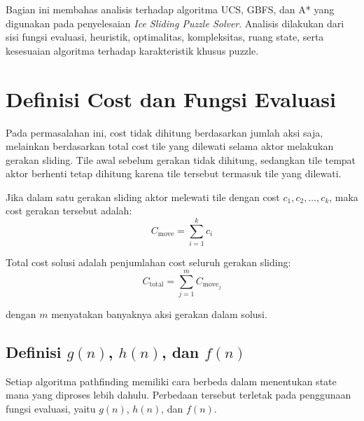 Bagian ini membahas analisis terhadap algoritma UCS, GBFS, dan A* yang digunakan pada penyelesaian \textit{Ice Sliding Puzzle Solver}. 
Analisis dilakukan dari sisi fungsi evaluasi, heuristik, optimalitas, kompleksitas, ruang state, serta kesesuaian algoritma terhadap karakteristik khusus puzzle.

\section{Definisi Cost dan Fungsi Evaluasi}

Pada permasalahan ini, cost tidak dihitung berdasarkan jumlah aksi saja, melainkan berdasarkan total cost tile yang dilewati selama aktor melakukan gerakan sliding. 
Tile awal sebelum gerakan tidak dihitung, sedangkan tile tempat aktor berhenti tetap dihitung karena tile tersebut termasuk tile yang dilewati.

\begin{tcolorbox}[
	colback=blue!5,
	colframe=blue!60!black,
	title=\textbf{Definisi Cost Gerakan},
	arc=2mm,
	boxrule=0.8pt
]
Jika dalam satu gerakan sliding aktor melewati tile dengan cost $c_1, c_2, \ldots, c_k$, maka cost gerakan tersebut adalah:
\[
	C_{\text{move}} = \sum_{i=1}^{k} c_i
\]

Total cost solusi adalah penjumlahan cost seluruh gerakan sliding:
\[
	C_{\text{total}} = \sum_{j=1}^{m} C_{\text{move}_j}
\]

dengan $m$ menyatakan banyaknya aksi gerakan dalam solusi.
\end{tcolorbox}

\subsection{Definisi $g(n)$, $h(n)$, dan $f(n)$}

Setiap algoritma pathfinding memiliki cara berbeda dalam menentukan state mana yang diproses lebih dahulu. 
Perbedaan tersebut terletak pada penggunaan fungsi evaluasi, yaitu $g(n)$, $h(n)$, dan $f(n)$.

